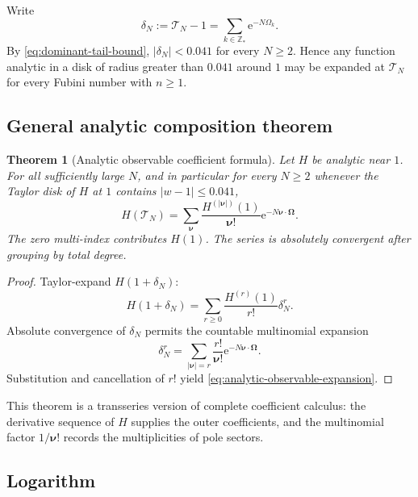 \documentclass[11pt,oneside]{article}
\numberwithin{equation}{section}
\newtheorem{theorem}{Theorem}[section]
\newcommand{\e}{\mathrm e}
\newcommand{\Z}{\mathbb Z}
\newcommand{\abs}[1]{\left|#1\right|}
\begin{document}
Write
\begin{equation}
 \delta_N:=\mathscr T_N-1
 =\sum_{k\in\Z_*}\e^{-N\Omega_k}.
 \label{eq:deltaN}
\end{equation}
By \cref{eq:dominant-tail-bound}, \(\abs{\delta_N}<0.041\) for every \(N\ge2\).  Hence any function analytic in a disk of radius greater than \(0.041\) around \(1\) may be expanded at \(\mathscr T_N\) for every Fubini number with \(n\ge1\).

\subsection{General analytic composition theorem}

\begin{theorem}[Analytic observable coefficient formula]
\label{thm:analytic-observable}
Let \(H\) be analytic near \(1\).  For all sufficiently large \(N\), and in particular for every \(N\ge2\) whenever the Taylor disk of \(H\) at \(1\) contains \(\abs{w-1}\le0.041\),
\begin{equation}
 \boxed{\displaystyle
 H(\mathscr T_N)
 =\sum_{\bm\nu}
 \frac{H^{(\abs{\bm\nu})}(1)}{\bm\nu!}
 \e^{-N\bm\nu\cdot\bm\Omega}.}
 \label{eq:analytic-observable-expansion}
\end{equation}
The zero multi-index contributes \(H(1)\).  The series is absolutely convergent after grouping by total degree.
\end{theorem}

\begin{proof}
Taylor-expand \(H(1+\delta_N)\):
\[
 H(1+\delta_N)=\sum_{r\ge0}\frac{H^{(r)}(1)}{r!}\delta_N^r.
\]
Absolute convergence of \(\delta_N\) permits the countable multinomial expansion
\[
 \delta_N^r
 =\sum_{\abs{\bm\nu}=r}\frac{r!}{\bm\nu!}
   \e^{-N\bm\nu\cdot\bm\Omega}.
\]
Substitution and cancellation of \(r!\) yield \cref{eq:analytic-observable-expansion}.
\end{proof}

This theorem is a transseries version of complete coefficient calculus: the derivative sequence of \(H\) supplies the outer coefficients, and the multinomial factor \(1/\bm\nu!\) records the multiplicities of pole sectors.

\subsection{Logarithm}
\end{document}
